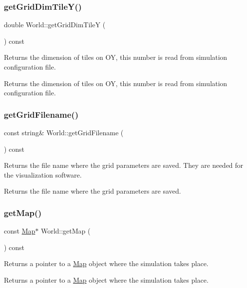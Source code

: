 \subsubsection{\texorpdfstring{get\+Grid\+Dim\+Tile\+Y()}{getGridDimTileY()}}
{\footnotesize\ttfamily double World\+::get\+Grid\+Dim\+TileY (\begin{DoxyParamCaption}{ }\end{DoxyParamCaption}) const\hspace{0.3cm}{\ttfamily [private]}}

Returns the dimension of tiles on OY, this number is read from simulation configuration file. \begin{DoxyReturn}{Returns}
the dimension of tiles on OY, this number is read from simulation configuration file. 
\end{DoxyReturn}
\mbox{\label{class_world_a7d07b06f9884185161c5cc34034a7212}} 
\subsubsection{\texorpdfstring{get\+Grid\+Filename()}{getGridFilename()}}
{\footnotesize\ttfamily const string\& World\+::get\+Grid\+Filename (\begin{DoxyParamCaption}{ }\end{DoxyParamCaption}) const}

Returns the file name where the grid parameters are saved. They are needed for the visualization software. \begin{DoxyReturn}{Returns}
the file name where the grid parameters are saved. 
\end{DoxyReturn}
\mbox{\label{class_world_a33b8543ee812ae4f8ff93329444da4cb}} 
\subsubsection{\texorpdfstring{get\+Map()}{getMap()}}
{\footnotesize\ttfamily const \hyperlink{class_map}{Map}$\ast$ World\+::get\+Map (\begin{DoxyParamCaption}{ }\end{DoxyParamCaption}) const}

Returns a pointer to a \hyperlink{class_map}{Map} object where the simulation takes place. \begin{DoxyReturn}{Returns}
a pointer to a \hyperlink{class_map}{Map} object where the simulation takes place. 
\end{DoxyReturn}
\mbox{\label{class_world_a2830d2aea7d91f98257c1e661527289e}} 

